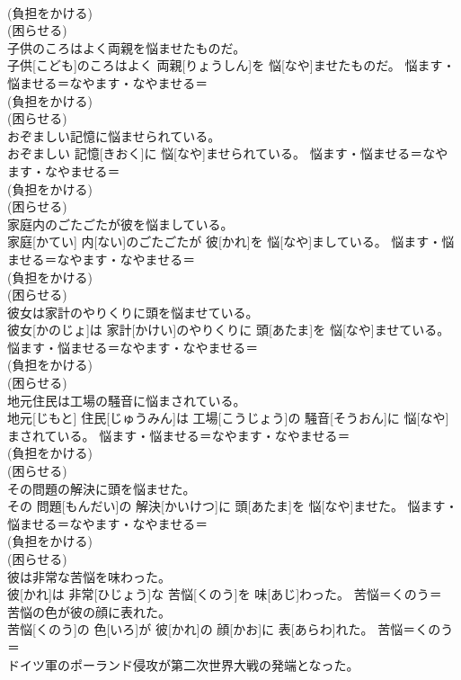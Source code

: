 \documentclass[8pt]{extreport}
\begin{document}
\begin{CJK}{UTF8}{min}
{\\	(負担をかける) 
\\	(困らせる) 
\\	子供のころはよく両親を悩ませたものだ。	
\\	子供[こども]のころはよく 両親[りょうしん]を 悩[なや]ませたものだ。	悩ます・悩ませる＝なやます・なやませる＝ 
\\	(負担をかける) 
\\	(困らせる) 
\\	おぞましい記憶に悩ませられている。	
\\	おぞましい 記憶[きおく]に 悩[なや]ませられている。	悩ます・悩ませる＝なやます・なやませる＝ 
\\	(負担をかける) 
\\	(困らせる) 
\\	家庭内のごたごたが彼を悩ましている。	
\\	家庭[かてい] 内[ない]のごたごたが 彼[かれ]を 悩[なや]ましている。	悩ます・悩ませる＝なやます・なやませる＝ 
\\	(負担をかける) 
\\	(困らせる) 
\\	彼女は家計のやりくりに頭を悩ませている。	
\\	彼女[かのじょ]は 家計[かけい]のやりくりに 頭[あたま]を 悩[なや]ませている。	悩ます・悩ませる＝なやます・なやませる＝ 
\\	(負担をかける) 
\\	(困らせる) 
\\	地元住民は工場の騒音に悩まされている。	
\\	地元[じもと] 住民[じゅうみん]は 工場[こうじょう]の 騒音[そうおん]に 悩[なや]まされている。	悩ます・悩ませる＝なやます・なやませる＝ 
\\	(負担をかける) 
\\	(困らせる) 
\\	その問題の解決に頭を悩ませた。	
\\	その 問題[もんだい]の 解決[かいけつ]に 頭[あたま]を 悩[なや]ませた。	悩ます・悩ませる＝なやます・なやませる＝ 
\\	(負担をかける) 
\\	(困らせる) 
\\	彼は非常な苦悩を味わった。	
\\	彼[かれ]は 非常[ひじょう]な 苦悩[くのう]を 味[あじ]わった。	苦悩＝くのう＝ 
\\	苦悩の色が彼の顔に表れた。	
\\	苦悩[くのう]の 色[いろ]が 彼[かれ]の 顔[かお]に 表[あらわ]れた。	苦悩＝くのう＝ 
\\	ドイツ軍のポーランド侵攻が第二次世界大戦の発端となった。	
}
\end{CJK}
\end{document}
